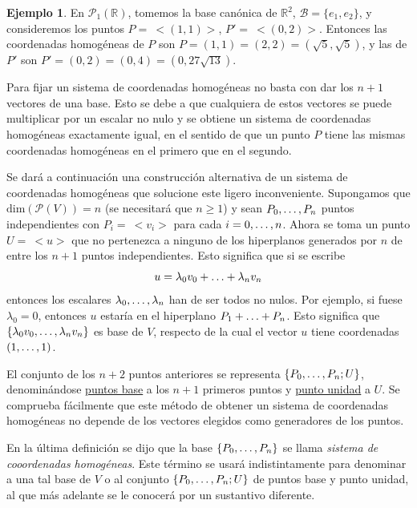 \documentclass[12pt]{report}
\theoremstyle{definition}
\theoremstyle{definition}
\newtheorem{example}{Ejemplo}[chapter]
\theoremstyle{remark}
\newcommand{\R}{\mathbb R}
\begin{document}
\begin{example}
En $\mathcal{P}_1(\R)$, tomemos la base canónica de $\R^2$, $\mathcal{B} = \{e_1,e_2\}$, y consideremos los puntos $P = \ <(1,1)>$, $P' = \ <(0,2)>$. Entonces las coordenadas homogéneas de $P$ son $P = (1,1) = (2,2) = (\sqrt{5},\sqrt{5})$, y las de $P'$ son $P' = (0,2) = (0,4) = (0,27\sqrt{13})$.
\end{example}

Para fijar un sistema de coordenadas homogéneas no basta con dar los $n+1$ vectores de una base. Esto se debe a que cualquiera de estos vectores se puede multiplicar por un escalar no nulo y se obtiene un sistema de coordenadas homogéneas exactamente igual, en el sentido de que un punto $P$ tiene las mismas coordenadas homogéneas en el primero que en el segundo.

\vspace{2mm}
Se dará a continuación una construcción alternativa de un sistema de coordenadas homogéneas que solucione este ligero inconveniente. Supongamos que $\mathrm{dim}(\mathcal{P}(V)) = n$ (se necesitará que $n \geq 1$) y sean $P_0,\mathellipsis,P_n$ puntos independientes con $P_i = \ <v_i>$ para cada $i = 0,\mathellipsis,n$. Ahora se toma un punto $U = \ <u>$ que no pertenezca a ninguno de los hiperplanos generados por $n$ de entre los $n+1$ puntos independientes. Esto significa que si se escribe
\[u = \lambda_0 v_0 + \mathellipsis + \lambda_n v_n\]
entonces los escalares $\lambda_0, \mathellipsis, \lambda_n$ han de ser todos no nulos. Por ejemplo, si fuese $\lambda_0 = 0$, entonces $u$ estaría en el hiperplano $P_1+\mathellipsis+P_n$. Esto significa que $\{\lambda_0 v_0, \mathellipsis, \lambda_n v_n\}$ es base de $V$, respecto de la cual el vector $u$ tiene coordenadas $(1,\mathellipsis,1)$. 

\vspace{2mm}
El conjunto de los $n+2$ puntos anteriores se representa $\{P_0,\mathellipsis,P_n;U\}$, denominándose \ul{puntos base} a los $n+1$ primeros puntos y \ul{punto unidad} a $U$. Se comprueba fácilmente que este método de obtener un sistema de coordenadas homogéneas no depende de los vectores elegidos como generadores de los puntos.

\vspace{2mm}
En la última definición se dijo que la base $\{P_0,\mathellipsis,P_n\}$ se llama \textit{sistema de cooordenadas homogéneas}. Este término se usará indistintamente para denominar a una tal base de $V$ o al conjunto $\{P_0,\mathellipsis,P_n;U\}$ de puntos base y punto unidad, al que más adelante se le conocerá por un sustantivo diferente.
\end{document}
